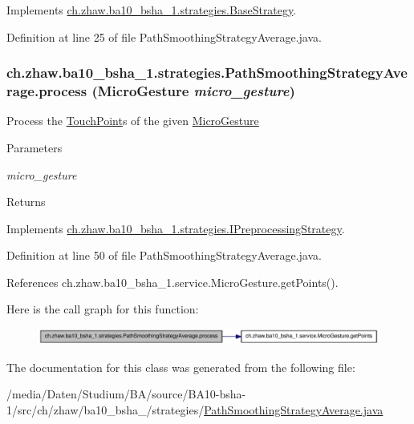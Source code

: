 Implements \hyperlink{classch_1_1zhaw_1_1ba10__bsha__1_1_1strategies_1_1BaseStrategy_af6ea27835befac71906915236a347450}{ch.zhaw.ba10\_\-bsha\_\-1.strategies.BaseStrategy}.

Definition at line 25 of file PathSmoothingStrategyAverage.java.\hypertarget{classch_1_1zhaw_1_1ba10__bsha__1_1_1strategies_1_1PathSmoothingStrategyAverage_a1f021ea53245e6ebfa044ca3bb8b0210}{
\subsubsection[{process}]{ ch.zhaw.ba10\_\-bsha\_\-1.strategies.PathSmoothingStrategyAverage.process ({\bf MicroGesture} {\em micro\_\-gesture})}}
\label{classch_1_1zhaw_1_1ba10__bsha__1_1_1strategies_1_1PathSmoothingStrategyAverage_a1f021ea53245e6ebfa044ca3bb8b0210}
Process the \hyperlink{classch_1_1zhaw_1_1ba10__bsha__1_1_1TouchPoint}{TouchPoint}s of the given \hyperlink{}{MicroGesture}


\begin{DoxyParams}{Parameters}
\item[{\em micro\_\-gesture}]\end{DoxyParams}
\begin{DoxyReturn}{Returns}

\end{DoxyReturn}


Implements \hyperlink{interfacech_1_1zhaw_1_1ba10__bsha__1_1_1strategies_1_1IPreprocessingStrategy_a3e3885dce8fda7b79dc514078f11ad62}{ch.zhaw.ba10\_\-bsha\_\-1.strategies.IPreprocessingStrategy}.

Definition at line 50 of file PathSmoothingStrategyAverage.java.

References ch.zhaw.ba10\_\-bsha\_\-1.service.MicroGesture.getPoints().

Here is the call graph for this function:\nopagebreak
\begin{figure}[H]
\begin{center}
\leavevmode
\includegraphics[width=335pt]{classch_1_1zhaw_1_1ba10__bsha__1_1_1strategies_1_1PathSmoothingStrategyAverage_a1f021ea53245e6ebfa044ca3bb8b0210_cgraph}
\end{center}
\end{figure}


The documentation for this class was generated from the following file:\begin{DoxyCompactItemize}
\item 
/media/Daten/Studium/BA/source/BA10-\/bsha-\/1/src/ch/zhaw/ba10\_\-bsha\_/strategies/\hyperlink{PathSmoothingStrategyAverage_8java}{PathSmoothingStrategyAverage.java}\end{DoxyCompactItemize}
